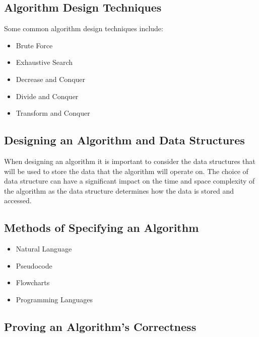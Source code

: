 \documentclass[12pt letter]{report}
\begin{document}
\subsection{Algorithm Design Techniques}


Some common algorithm design techniques include:
\begin{itemize}
  \item Brute Force
  \item Exhaustive Search
  \item Decrease and Conquer
  \item Divide and Conquer
  \item Transform and Conquer
\end{itemize}

\subsection{Designing an Algorithm and Data Structures}

When designing an algorithm it is important to consider the data structures that will be used to store the data that the algorithm
will operate on. The choice of data structure can have a significant impact on the time and space complexity of the
algorithm as the data structure determines how the data is stored and accessed.

\subsection{Methods of Specifying an Algorithm}

\begin{itemize}
  \item Natural Language
  \item Pseudocode
  \item Flowcharts
  \item Programming Languages
\end{itemize}

\subsection{Proving an Algorithm's Correctness}
\end{document}
